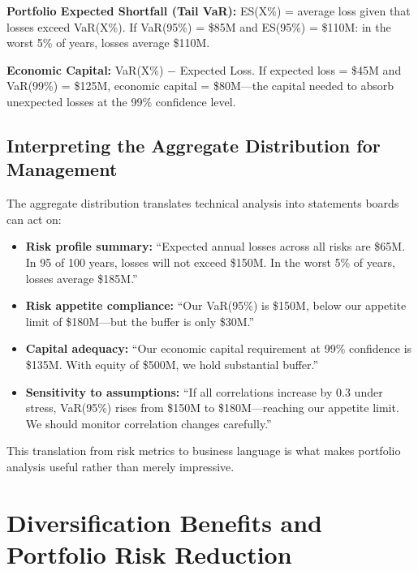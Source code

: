 \documentclass[11pt,openany]{book}
\providecommand{\tightlist}{\setlength{\itemsep}{0pt}\setlength{\parskip}{0pt}}
\begin{document}
\textbf{Portfolio Expected Shortfall (Tail VaR):} ES(X\%) = average loss given
that losses exceed VaR(X\%). If VaR(95\%) = \$85M and ES(95\%) = \$110M: in
the worst 5\% of years, losses average \$110M.

\textbf{Economic Capital:} VaR(X\%) \(-\) Expected Loss. If expected loss =
\$45M and VaR(99\%) = \$125M, economic capital = \$80M---the capital needed to
absorb unexpected losses at the 99\% confidence level.

\subsection{Interpreting the Aggregate Distribution for Management}
\label{subsec:interpreting-distribution}

The aggregate distribution translates technical analysis into statements
boards can act on:

\begin{itemize}\tightlist
  \item \textbf{Risk profile summary:} ``Expected annual losses across all
        risks are \$65M. In 95 of 100 years, losses will not exceed \$150M. In
        the worst 5\% of years, losses average \$185M.''
  \item \textbf{Risk appetite compliance:} ``Our VaR(95\%) is \$150M, below
        our appetite limit of \$180M---but the buffer is only \$30M.''
  \item \textbf{Capital adequacy:} ``Our economic capital requirement at 99\%
        confidence is \$135M. With equity of \$500M, we hold substantial
        buffer.''
  \item \textbf{Sensitivity to assumptions:} ``If all correlations increase by
        0.3 under stress, VaR(95\%) rises from \$150M to \$180M---reaching our
        appetite limit. We should monitor correlation changes carefully.''
\end{itemize}

This translation from risk metrics to business language is what makes
portfolio analysis useful rather than merely impressive.

\section{Diversification Benefits and Portfolio Risk Reduction}
\label{sec:diversification}
\end{document}
